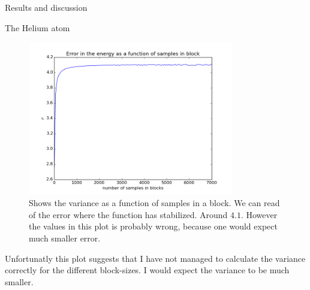 \documentclass[a4paper, 12pt, titlepage]{article}
\begin{document}
\begin{section}{Results and discussion}
\begin{subsection}{The Helium atom}
\begin{figure}[H]
 	\centering
 	\includegraphics[width=0.8\textwidth]{../../Project3_Gaussian/python_scripts/HeliumBlocking.png}
 	\caption{Shows the variance as a function of samples in a block. We can read of the error where the function has stabilized. Around $4.1$. However the values in this plot is probably wrong, because one would expect much smaller error.}
 	\end{figure}
 	Unfortunatly this plot suggests that I have not managed to calculate the variance correctly for the different block-sizes. I would expect the variance to be much smaller. 



\end{subsection}
\end{section}
\end{document}
